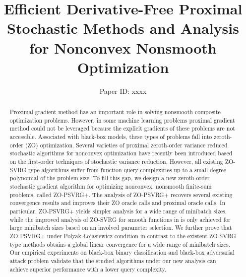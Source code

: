 \documentclass[letterpaper]{article} %
\begin{document}
%
\title{Efficient Derivative-Free Proximal Stochastic Methods and Analysis for Nonconvex Nonsmooth Optimization}
\author{
Paper ID: xxxx
}
\maketitle
\begin{abstract}
Proximal gradient method has an important role
in solving nonsmooth composite optimization problems. However, in some machine learning problems  proximal gradient method could not be leveraged because the explicit gradients of these problems are not accessible. Associated with black-box models, these  types  of  problems fall  into  zeroth-order (ZO) optimization. Several varieties of proximal zeroth-order variance reduced stochastic algorithms  for nonconvex optimization have recently been introduced  based on the first-order techniques of stochastic variance reduction. 
However, all existing ZO-SVRG type  algorithms suffer from function query complexities up  to a small-degree  polynomial  of  the  problem  size. To fill this gap, we design a new zeroth-order stochastic gradient algorithm for optimizing nonconvex, nonsmooth finite-sum problems, called ZO-PSVRG+. The analysis of ZO-PSVRG+ recovers several existing convergence results and improves their ZO oracle calls and proximal oracle calls. In particular, ZO-PSVRG+ yields simpler analysis  for a wide range of minibatch sizes, while the improved analysis of ZO-SVRG for smooth functions in \cite{ji2019improved} is only achieved for large minibatch sizes based on an involved parameter selection. We further prove that ZO-PSVRG+ under Polyak-Łojasiewicz condition in contrast to the existent ZO-SVRG type methods obtains a global linear convergence for a wide range of minibatch sizes. Our empirical experiments on black-box binary classification and black-box adversarial attack problem
validate  that  the studied algorithms under our new analysis  can  achieve  superior performance with a lower  query complexity. 
\end{abstract}

\noindent 


\fontsize{9.0pt}{10.0pt} \selectfont


%
\end{document}
